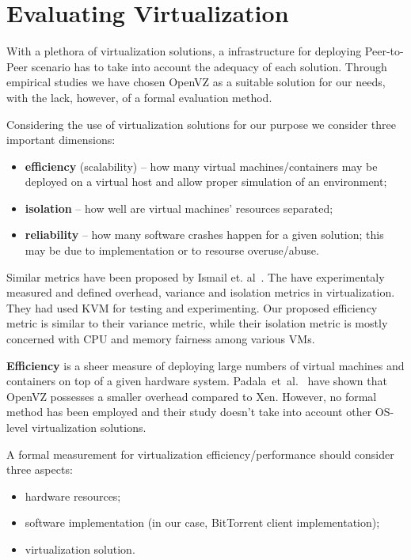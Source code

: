 \section{Evaluating Virtualization}

With a plethora of virtualization solutions, a infrastructure for deploying
Peer-to-Peer scenario has to take into account the adequacy of each solution.
Through empirical studies we have chosen OpenVZ as a suitable solution for our
needs, with the lack, however, of a formal evaluation method.

Considering the use of virtualization solutions for our purpose we consider
three important dimensions:

\begin{itemize}
  \item \textbf{efficiency} (scalability) -- how many virtual
  machines/containers may be deployed on a virtual host and allow proper
  simulation of an environment;
  \item \textbf{isolation} -- how well are virtual machines' resources
  separated;
  \item \textbf{reliability} -- how many software crashes happen for a given
  solution; this may be due to implementation or to resourse overuse/abuse.
\end{itemize}

Similar metrics have been proposed by Ismail et. al~\cite{virt-metrics}. The
have experimentaly measured and defined overhead, variance and isolation
metrics in virtualization. They had used KVM for testing and experimenting.
Our proposed efficiency metric is similar to their variance metric, while
their isolation metric is mostly concerned with CPU and memory fairness among
various VMs.

\textbf{Efficiency} is a sheer measure of deploying large numbers of virtual
machines and containers on top of a given hardware system.
Padala~et~al.~\cite{eval-virt-performance} have shown that OpenVZ possesses a
smaller overhead compared to Xen. However, no formal method has been employed
and their study doesn't take into account other OS-level virtualization
solutions.

A formal measurement for virtualization efficiency/performance should consider
three aspects:

\begin{itemize}
  \item hardware resources;
  \item software implementation (in our case, BitTorrent client
  implementation);
  \item virtualization solution.
\end{itemize}

